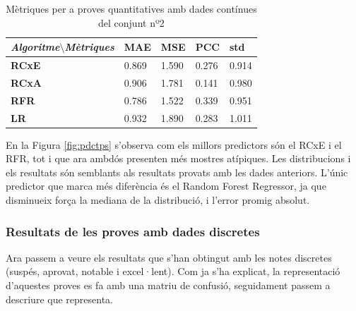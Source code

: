 \documentclass[12pt,a4paper,catalan]{article}
\begin{document}
\begin{table}[h]
\centering
\begin{tabular}{lllll}
\hline
\textit{\textbf{Algoritme$\setminus$Mètriques}} & \textbf{MAE} & \textbf{MSE} & \textbf{PCC} & \textbf{std} \\ \hline
\textbf{RCxE}          & 0.869          & 1.590          & 0.276          & 0.914          \\
\textbf{RCxA}          & 0.906          & 1.781          & 0.141          & 0.980          \\
\textbf{RFR}           & 0.786          & 1.522          & 0.339          & 0.951          \\
\textbf{LR}            & 0.932          & 1.890          & 0.283          & 1.011          \\ \hline
\end{tabular}
\caption{Mètriques per a proves quantitatives amb dades contínues del conjunt nº2}
\label{tab:mpqdcc2}
\end{table}

\newpage

En la Figura \ref{fig:pdctps} s'observa com els millors predictors són el RCxE i el RFR, tot i que ara ambdós presenten més mostres atípiques. Les distribucions i els resultats són semblants als resultats provats amb les dades anteriors. L'únic predictor que marca més diferència és el Random Forest Regressor, ja que disminueix força  la mediana de la distribució, i l'error promig absolut.

\newpage

\subsubsection{Resultats de les proves amb dades discretes}

Ara passem a veure els resultats que s'han obtingut amb les notes discretes (suspés, aprovat, notable i excel·lent). Com ja s'ha explicat, la representació d'aquestes proves es fa amb una matriu de confusió, seguidament passem a descriure que representa.
\end{document}
